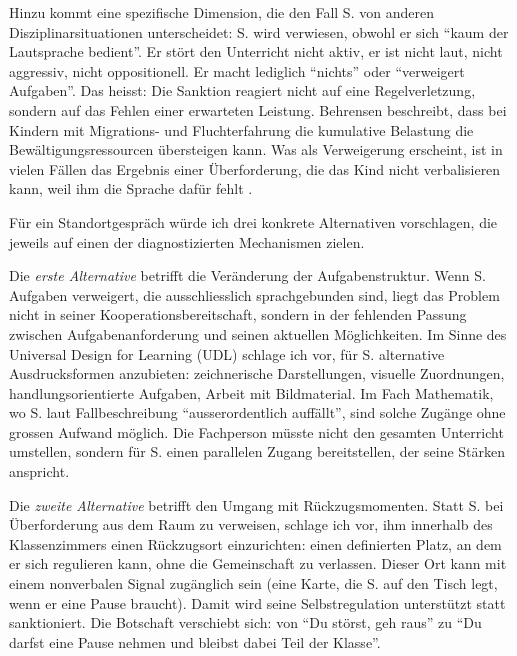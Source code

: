 \documentclass[ngerman, a4paper]{article}
\begin{document}
Hinzu kommt eine spezifische Dimension, die den Fall S. von anderen
Disziplinarsituationen unterscheidet: S. wird verwiesen, obwohl er sich
\enquote{kaum der Lautsprache bedient}. Er stört den Unterricht nicht aktiv,
er ist nicht laut, nicht aggressiv, nicht oppositionell. Er macht lediglich
\enquote{nichts} oder \enquote{verweigert Aufgaben}. Das heisst: Die Sanktion
reagiert nicht auf eine Regelverletzung, sondern auf das Fehlen einer erwarteten
Leistung. Behrensen beschreibt, dass bei Kindern mit Migrations- und
Fluchterfahrung die kumulative Belastung die Bewältigungsressourcen übersteigen
kann. Was als Verweigerung erscheint, ist in vielen Fällen das Ergebnis einer
Überforderung, die das Kind nicht verbalisieren kann, weil ihm die Sprache
dafür fehlt \parencite{behrensen2019inklusive}.

Für ein Standortgespräch würde ich drei konkrete Alternativen vorschlagen, die
jeweils auf einen der diagnostizierten Mechanismen zielen.

Die \textit{erste Alternative} betrifft die Veränderung der Aufgabenstruktur.
Wenn S. Aufgaben verweigert, die ausschliesslich sprachgebunden sind, liegt
das Problem nicht in seiner Kooperationsbereitschaft, sondern in der fehlenden
Passung zwischen Aufgabenanforderung und seinen aktuellen Möglichkeiten. Im
Sinne des Universal Design for Learning (UDL) schlage ich vor, für S. alternative
Ausdrucksformen anzubieten: zeichnerische Darstellungen, visuelle Zuordnungen,
handlungsorientierte Aufgaben, Arbeit mit Bildmaterial. Im Fach Mathematik, wo
S. laut Fallbeschreibung \enquote{ausserordentlich auffällt}, sind solche Zugänge
ohne grossen Aufwand möglich. Die Fachperson müsste nicht den gesamten Unterricht
umstellen, sondern für S. einen parallelen Zugang bereitstellen, der seine
Stärken anspricht.

Die \textit{zweite Alternative} betrifft den Umgang mit Rückzugsmomenten. Statt
S. bei Überforderung aus dem Raum zu verweisen, schlage ich vor, ihm innerhalb
des Klassenzimmers einen Rückzugsort einzurichten: einen definierten Platz,
an dem er sich regulieren kann, ohne die Gemeinschaft zu verlassen. Dieser Ort
kann mit einem nonverbalen Signal zugänglich sein (eine Karte, die S. auf den
Tisch legt, wenn er eine Pause braucht). Damit wird seine Selbstregulation
unterstützt statt sanktioniert. Die Botschaft verschiebt sich: von
\enquote{Du störst, geh raus} zu \enquote{Du darfst eine Pause nehmen
und bleibst dabei Teil der Klasse}.
\end{document}
